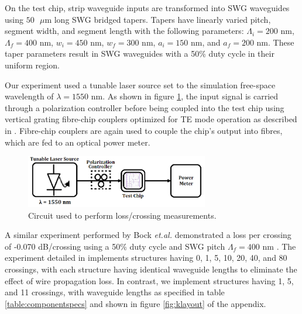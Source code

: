 \documentclass[aps,prl,twocolumn, superscriptaddress]{revtex4}
\begin{document}
On the test chip, strip waveguide inputs are transformed into SWG waveguides using $50 \text{ } \mu$m long SWG bridged tapers. Tapers have linearly varied pitch, segment width, and segment length with the following parameters: $\Lambda_i = 200$ nm, $\Lambda_f = 400$ nm, $w_i = 450$ nm, $w_f = 300$ nm, $a_i = 150$ nm, and $a_f = 200$ nm. These taper parameters result in SWG waveguides with a 50\% duty cycle in their uniform region.

Our experiment used a tunable laser source set to the simulation free-space wavelength of $\lambda = 1550$ nm. As shown in figure \ref{fig:circuitdiag}, the input signal is carried through a polarization controller before being coupled into the test chip using vertical grating fibre-chip couplers optimized for TE mode operation as described in \cite{GratingCoupler}. Fibre-chip couplers are again used to couple the chip's output into fibres, which are fed to an optical power meter. 

\begin{figure}[!h]
    \centering \includegraphics[width=8cm]{circuitdiag.png}
    \caption{Circuit used to perform loss/crossing measurements.}
    \label{fig:circuitdiag}
\end{figure}

A similar experiment performed by Bock \textit{et.al.} demonstrated a loss per crossing of -0.070 dB/crossing using a 50\% duty cycle and SWG pitch $\Lambda_f = 400$ nm \cite{BockPaper}. The experiment detailed in \cite{BockPaper} implements structures having 0, 1, 5, 10, 20, 40, and 80 crossings, with each structure having identical waveguide lengths to eliminate the effect of wire propagation loss. In contrast, we implement structures having 1, 5, and 11 crossings, with waveguide lengths as specified in table \ref{table:componentspecs} and shown in figure \ref{fig:klayout} of the appendix.
 
\end{document}
